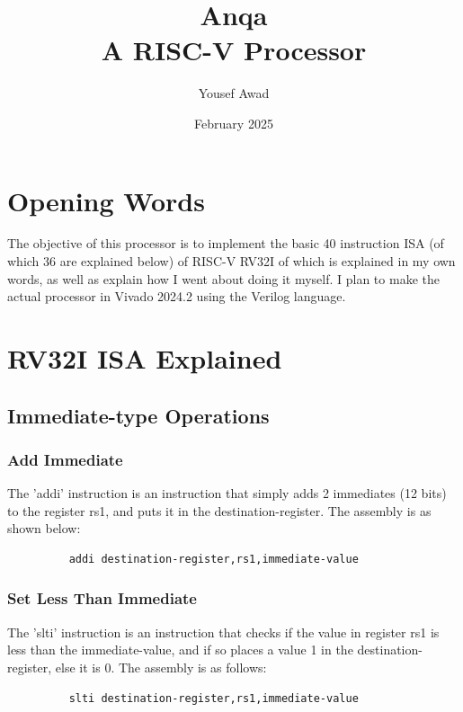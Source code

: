 \documentclass{article}
\title{Anqa \\ \small A RISC-V Processor}
\author{Yousef Awad}
\date{February 2025}
\begin{document}
\maketitle

\section{Opening Words}
\qquad
The objective of this processor is to implement the basic 40 instruction ISA (of which 36 are explained below) of RISC-V RV32I of which is explained in my own words, as well as explain how I went about doing it myself. I plan to make the actual processor in Vivado 2024.2 using the Verilog language.
\newpage



\tableofcontents
\newpage



\section{RV32I ISA Explained}
\subsection{Immediate-type Operations}

\subsubsection{Add Immediate}
\qquad
The 'addi' instruction is an instruction that simply adds 2 immediates (12 bits) to the register rs1, and puts it in the destination-register. The assembly is as shown below:
\begin{figure}[!htbp]
    \centering
    \begin{verbatim}
    addi destination-register,rs1,immediate-value
    \end{verbatim}
\end{figure}\newline

\subsubsection{Set Less Than Immediate}
\qquad
The 'slti' instruction is an instruction that checks if the value in register rs1 is less than the immediate-value, and if so places a value 1 in the destination-register, else it is 0. The assembly is as follows:
\begin{figure}[!htbp]
    \centering
    \begin{verbatim}
    slti destination-register,rs1,immediate-value
    \end{verbatim}
\end{figure}\newline
\end{document}
